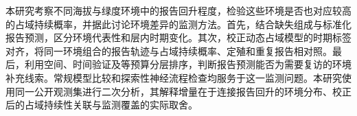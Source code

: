 本研究考察不同海拔与绿度环境中的报告回升程度，检验这些环境是否也对应较高的占域持续概率，并据此讨论环境差异的监测方法。首先，结合缺失组成与标准化报告预测，区分环境代表性和层内时期变化。其次，校正动态占域模型的时期标签对齐，将同一环境组合的报告轨迹与占域持续概率、定殖和重复报告相对照。最后，利用空间、时间验证及等预算分层排序，判断报告预测能否为需要复访的环境补充线索。常规模型比较和探索性神经流程检查均服务于这一监测问题。本研究使用同一公开观测集进行二次分析，其解释增量在于连接报告回升的环境分布、校正后的占域持续性关联与监测覆盖的实际取舍。
